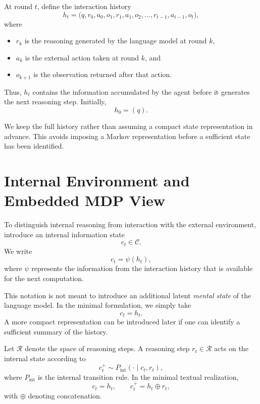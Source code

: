 \documentclass[11pt]{article}
\begin{document}
At round \(t\), define the interaction history
\begin{equation}
    h_t
    =
    \bigl(
    q,
    r_0,a_0,o_1,
    r_1,a_1,o_2,
    \ldots,
    r_{t-1},a_{t-1},o_t
    \bigr),
    \label{eq:history}
\end{equation}
where
\begin{itemize}
    \item \(r_k\) is the reasoning generated by the language model at round \(k\),
    \item \(a_k\) is the external action taken at round \(k\), and
    \item \(o_{k+1}\) is the observation returned after that action.
\end{itemize}

Thus, \(h_t\) contains the information accumulated by the agent before it generates the next reasoning step. Initially,
\[
h_0=(q).
\]

We keep the full history rather than assuming a compact state representation in advance. This avoids imposing a Markov representation before a sufficient state has been identified.

\section{Internal Environment and Embedded MDP View}

To distinguish internal reasoning from interaction with the external environment, introduce an internal information state
\[
c_t\in\mathcal{C}.
\]
We write
\begin{equation}
    c_t=\psi(h_t),
    \label{eq:internal-state}
\end{equation}
where \(\psi\) represents the information from the interaction history that is available for the next computation.

This notation is not meant to introduce an additional latent \emph{mental state} of the language model. In the minimal formulation, we simply take
\begin{equation}
    c_t=h_t.
    \label{eq:internal-state-minimal}
\end{equation}
A more compact representation can be introduced later if one can identify a sufficient summary of the history.

Let \(\mathcal{R}\) denote the space of reasoning steps. A reasoning step \(r_t\in\mathcal{R}\) acts on the internal state according to
\begin{equation}
    c_t^{+}
    \sim
    P_{\mathrm{int}}(\cdot\mid c_t,r_t),
    \label{eq:internal-transition}
\end{equation}
where \(P_{\mathrm{int}}\) is the internal transition rule. In the minimal textual realization,
\begin{equation}
    c_t=h_t,
    \qquad
    c_t^{+}=h_t\oplus r_t,
    \label{eq:internal-transition-minimal}
\end{equation}
with \(\oplus\) denoting concatenation.
\end{document}
